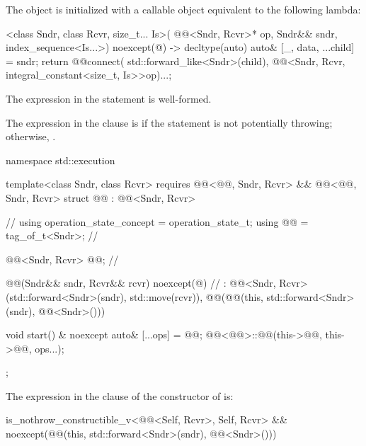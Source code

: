 \pnum
The object  is initialized with
a callable object equivalent to the following lambda:
\begin{itemdecl}
[]<class Sndr, class Rcvr, size_t... Is>(
  @@<Sndr, Rcvr>* op, Sndr&& sndr, index_sequence<Is...>) noexcept(@\seebelow@)
    -> decltype(auto) {
    auto& [_, data, ...child] = sndr;
    return @@{connect(
      std::forward_like<Sndr>(child),
      @@<Sndr, Rcvr, integral_constant<size_t, Is>>{op})...};
  }
\end{itemdecl}

\begin{itemdescr}
\pnum
\constraints
The expression in the  statement is well-formed.

\pnum
\remarks
The expression in the  clause is 
if the  statement is not potentially throwing;
otherwise, .
\end{itemdescr}

\pnum
\begin{codeblock}
namespace std::execution {
  template<class Sndr, class Rcvr>
    requires @@<@@, Sndr, Rcvr> &&
             @@<@@, Sndr, Rcvr>
  struct @@ : @@<Sndr, Rcvr> {            // \expos
    using operation_state_concept = operation_state_t;
    using @@ = tag_of_t<Sndr>;                               // \expos

    @@<Sndr, Rcvr> @@;                   // \expos

    @@(Sndr&& sndr, Rcvr&& rcvr) noexcept(@\seebelownc@)               // \expos
      : @@<Sndr, Rcvr>(std::forward<Sndr>(sndr), std::move(rcvr)),
        @@(@@(this, std::forward<Sndr>(sndr), @@<Sndr>()))
    {}

    void start() & noexcept {
      auto& [...ops] = @@;
      @@<@@>::@@(this->@@, this->@@, ops...);
    }
  };
}
\end{codeblock}

\pnum
The expression in the  clause of
the constructor of  is:
\begin{codeblock}
is_nothrow_constructible_v<@@<Self, Rcvr>, Self, Rcvr> &&
noexcept(@@(this, std::forward<Sndr>(sndr), @@<Sndr>()))
\end{codeblock}

